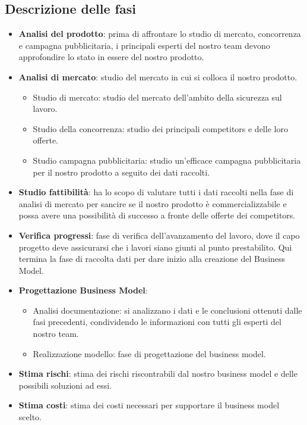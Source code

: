 \subsection{Descrizione delle fasi}
\begin{itemize}

\item \textbf{Analisi del prodotto}: prima di affrontare lo studio di mercato, concorrenza e campagna pubblicitaria, i principali esperti del nostro team devono approfondire lo stato in essere del nostro prodotto.

\item \textbf{Analisi di mercato}: studio del mercato in cui si colloca il nostro prodotto.
\begin{itemize}

\item Studio di mercato: studio del mercato dell'ambito della sicurezza sul lavoro.

\item Studio della concorrenza: studio dei principali competitors e delle loro offerte.

\item Studio campagna pubblicitaria: studio un'efficace campagna pubblicitaria per il nostro prodotto a seguito dei dati raccolti.

\end{itemize}

\item \textbf{Studio fattibilità}: ha lo scopo di valutare tutti i dati raccolti nella fase di analisi di mercato per sancire se il nostro prodotto è commercializzabile e possa avere una possibilità di successo a fronte delle offerte dei competitors.

\item \textbf{Verifica progressi}: fase di verifica dell'avanzamento del lavoro, dove il capo progetto deve assicurarsi che i lavori siano giunti al punto prestabilito. Qui termina la fase di raccolta dati per dare inizio alla creazione del Business Model. 

\item \textbf{Progettazione Business Model}:

\begin{itemize}

\item Analisi documentazione: si analizzano i dati e le conclusioni ottenuti dalle fasi precedenti, condividendo le informazioni con tutti gli esperti del nostro team.

\item Realizzazione modello: fase di progettazione del business model.

\end{itemize}

\item \textbf{Stima rischi}: stima dei rischi riscontrabili dal nostro business model e delle possibili soluzioni ad essi.

\item \textbf{Stima costi}: stima dei costi necessari per supportare il business model scelto.

\end{itemize}


